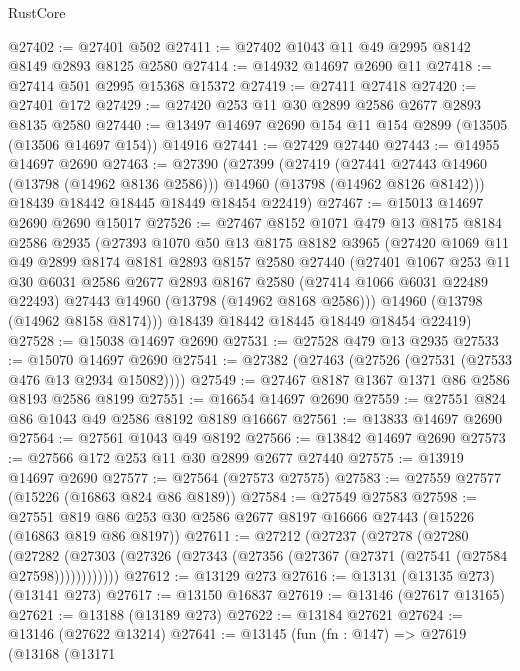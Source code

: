 \begin{lexlean}{RustCore}
\begin{coremodule}
@27402 := @27401 @502
@27411 := @27402 @1043 @11 @49 @2995 @8142 @8149 @2893 @8125 @2580
@27414 := @14932 @14697 @2690 @11
@27418 := @27414 @501 @2995 @15368 @15372
@27419 := @27411 @27418
@27420 := @27401 @172
@27429 := @27420 @253 @11 @30 @2899 @2586 @2677 @2893 @8135 @2580
@27440 := @13497 @14697 @2690 @154 @11 @154 @2899 (@13505 (@13506 @14697 @154)) @14916
@27441 := @27429 @27440
@27443 := @14955 @14697 @2690
@27463 := @27390
    (@27399
      (@27419
        (@27441 @27443 @14960 (@13798 (@14962 @8136 @2586)))
        @14960
        (@13798 (@14962 @8126 @8142)))
      @18439
      @18442
      @18445
      @18449
      @18454
      @22419)
@27467 := @15013 @14697 @2690 @2690 @15017
@27526 := @27467
    @8152
    @1071
    @479
    @13
    @8175
    @8184
    @2586
    @2935
    (@27393
      @1070
      @50
      @13
      @8175
      @8182
      @3965
      (@27420
        @1069
        @11
        @49
        @2899
        @8174
        @8181
        @2893
        @8157
        @2580
        @27440
        (@27401
          @1067
          @253
          @11
          @30
          @6031
          @2586
          @2677
          @2893
          @8167
          @2580
          (@27414 @1066 @6031 @22489 @22493)
          @27443
          @14960
          (@13798 (@14962 @8168 @2586)))
        @14960
        (@13798 (@14962 @8158 @8174)))
      @18439
      @18442
      @18445
      @18449
      @18454
      @22419)
@27528 := @15038 @14697 @2690
@27531 := @27528 @479 @13 @2935
@27533 := @15070 @14697 @2690
@27541 := @27382 (@27463 (@27526 (@27531 (@27533 @476 @13 @2934 @15082))))
@27549 := @27467 @8187 @1367 @1371 @86 @2586 @8193 @2586 @8199
@27551 := @16654 @14697 @2690
@27559 := @27551 @824 @86 @1043 @49 @2586 @8192 @8189 @16667
@27561 := @13833 @14697 @2690
@27564 := @27561 @1043 @49 @8192
@27566 := @13842 @14697 @2690
@27573 := @27566 @172 @253 @11 @30 @2899 @2677 @27440
@27575 := @13919 @14697 @2690
@27577 := @27564 (@27573 @27575)
@27583 := @27559 @27577 (@15226 (@16863 @824 @86 @8189))
@27584 := @27549 @27583
@27598 := @27551 @819 @86 @253 @30 @2586 @2677 @8197 @16666 @27443 (@15226 (@16863 @819 @86 @8197))
@27611 := @27212
    (@27237
      (@27278
        (@27280
          (@27282 (@27303 (@27326 (@27343 (@27356 (@27367 (@27371 (@27541 (@27584 @27598))))))))))))
@27612 := @13129 @273
@27616 := @13131 (@13135 @273) (@13141 @273)
@27617 := @13150 @16837
@27619 := @13146 (@27617 @13165)
@27621 := @13188 (@13189 @273)
@27622 := @13184 @27621
@27624 := @13146 (@27622 @13214)
@27641 := @13145
    (fun (fn : @147) =>
    @27619
      (@13168
        (@13171

\end{coremodule}
\end{lexlean}
